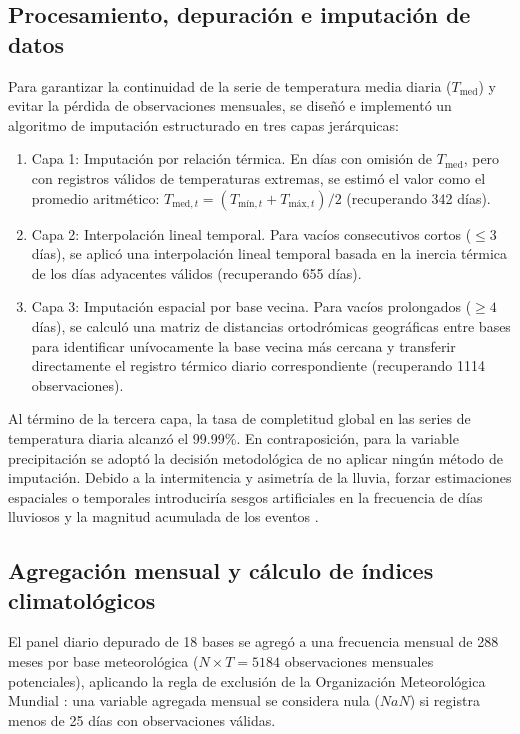 \documentclass[11pt,a4paper]{article}
\begin{document}
\subsection{Procesamiento, depuración e imputación de datos}
Para garantizar la continuidad de la serie de temperatura media diaria ($T_{\text{med}}$) y evitar la pérdida de observaciones mensuales, se diseñó e implementó un algoritmo de imputación estructurado en tres capas jerárquicas:
\begin{enumerate}
    \item {Capa 1: Imputación por relación térmica.} En días con omisión de $T_{\text{med}}$, pero con registros válidos de temperaturas extremas, se estimó el valor como el promedio aritmético: $T_{\text{med},t} = (T_{\text{mín},t} + T_{\text{máx},t})/2$ (recuperando 342 días).
    \item {Capa 2: Interpolación lineal temporal.} Para vacíos consecutivos cortos ($\le 3$ días), se aplicó una interpolación lineal temporal basada en la inercia térmica de los días adyacentes válidos (recuperando 655 días).
    \item {Capa 3: Imputación espacial por base vecina.} Para vacíos prolongados ($\ge 4$ días), se calculó una matriz de distancias ortodrómicas geográficas entre bases para identificar unívocamente la base vecina más cercana y transferir directamente el registro térmico diario correspondiente (recuperando 1114 observaciones). 
\end{enumerate}

Al término de la tercera capa, la tasa de completitud global en las series de temperatura diaria alcanzó el 99.99\%. En contraposición, para la variable precipitación se adoptó la decisión metodológica de no aplicar ningún método de imputación. Debido a la intermitencia y asimetría de la lluvia, forzar estimaciones espaciales o temporales introduciría sesgos artificiales en la frecuencia de días lluviosos y la magnitud acumulada de los eventos \citep{wooldridge2010}.

\subsection{Agregación mensual y cálculo de índices climatológicos}
El panel diario depurado de 18 bases se agregó a una frecuencia mensual de 288 meses por base meteorológica ($N \times T = 5184$ observaciones mensuales potenciales), aplicando la regla de exclusión de la Organización Meteorológica Mundial \citep{wmo2017}: una variable agregada mensual se considera nula ($NaN$) si registra menos de 25 días con observaciones válidas. 
\end{document}
